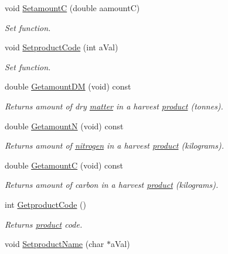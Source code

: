 \begin{DoxyCompactItemize}
void \hyperlink{classharv_info_class_a2a061c57df6018ca45d0b08d76e78398}{SetamountC} (double aamountC)
\begin{DoxyCompactList}\small\item\em Set function. \item\end{DoxyCompactList}\item 
void \hyperlink{classharv_info_class_a78841976fa02ba16ccc17165cced32fb}{SetproductCode} (int aVal)
\begin{DoxyCompactList}\small\item\em Set function. \item\end{DoxyCompactList}\item 
double \hyperlink{classharv_info_class_a5858cef78437d316bd6fb8897a0940d8}{GetamountDM} (void) const 
\begin{DoxyCompactList}\small\item\em Returns amount of dry \hyperlink{classmatter}{matter} in a harvest \hyperlink{classproduct}{product} (tonnes). \item\end{DoxyCompactList}\item 
double \hyperlink{classharv_info_class_abe831c13c5f1ef62a39db532478f3501}{GetamountN} (void) const 
\begin{DoxyCompactList}\small\item\em Returns amount of \hyperlink{classnitrogen}{nitrogen} in a harvest \hyperlink{classproduct}{product} (kilograms). \item\end{DoxyCompactList}\item 
double \hyperlink{classharv_info_class_a3e988f8774326261f60383a487f2dca3}{GetamountC} (void) const 
\begin{DoxyCompactList}\small\item\em Returns amount of carbon in a harvest \hyperlink{classproduct}{product} (kilograms). \item\end{DoxyCompactList}\item 
int \hyperlink{classharv_info_class_ae050b8dda387fb17e1f64dc7ffc254b1}{GetproductCode} ()
\begin{DoxyCompactList}\small\item\em Returns \hyperlink{classproduct}{product} code. \item\end{DoxyCompactList}\item 
void \hyperlink{classharv_info_class_ad65bdedd15fb72b42bd8e0f90c72305a}{SetproductName} (char $\ast$aVal)
\end{DoxyCompactItemize}
